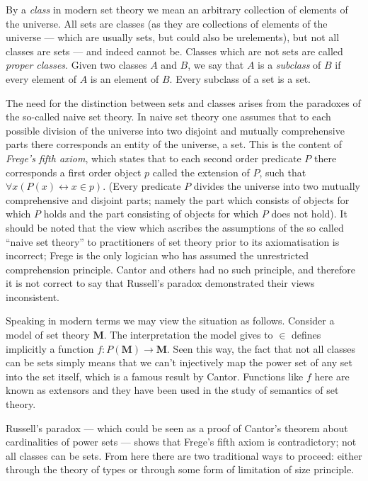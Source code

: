 \documentclass[12pt]{article}
\begin{document}

By a \emph{class} in modern set theory we mean an arbitrary collection of elements of the universe.
All sets are classes (as they are collections of elements of the universe --- which are usually sets, but could also be urelements), but not all classes are sets --- and indeed cannot be.
Classes which are not sets are called \emph{proper classes}.
Given two classes $A$ and $B$, we say that $A$ is a \emph{subclass} of $B$ if every element of $A$ is an element of $B$.
Every subclass of a set is a set.

The need for the distinction between sets and classes arises from the paradoxes of the so-called naive set theory. In naive set theory one assumes that to each possible division of the universe into two disjoint and mutually comprehensive parts there corresponds an entity of the universe, a set. This is the content of \emph{Frege's fifth axiom}, which states that to each second order predicate $P$ there corresponds a first order object $p$ called the extension of $P$, such that $\forall x ( P(x) \leftrightarrow x \in p)$. (Every predicate $P$ divides the universe into two mutually comprehensive and disjoint parts; namely the part which consists of objects for which $P$ holds and the part consisting of objects for which $P$ does not hold). It should be noted that the view which ascribes the assumptions of the so called ``naive set theory'' to practitioners of set theory prior to its axiomatisation is incorrect; Frege is the only logician who has assumed the unrestricted comprehension principle. Cantor and others had no such principle, and therefore it is not correct to say that Russell's paradox demonstrated their views inconsistent.

Speaking in modern terms we may view the situation as follows. Consider a model of set theory $\mathbf{M}$. The interpretation the model gives to $\in$ defines implicitly a function $f\colon P(\mathbf{M}) \to \mathbf{M}$. Seen this way, the fact that not all classes can be sets simply means that we can't injectively map the power set of any set into the set itself, which is a famous result by Cantor. Functions like $f$ here are known as extensors and they have been used in the study of semantics of set theory.

Russell's paradox --- which could be seen as a proof of Cantor's theorem about cardinalities of power sets --- shows that Frege's fifth axiom is contradictory; not all classes can be sets. From here there are two traditional ways to proceed: either through the theory of types or through some form of limitation of size principle.
\end{document}
